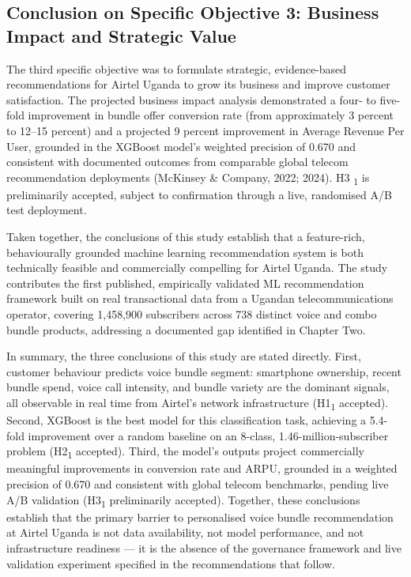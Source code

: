 \subsection{Conclusion on Specific Objective 3: Business Impact and Strategic Value}

The third specific objective was to formulate strategic, evidence-based recommendations for Airtel Uganda to grow its business and improve customer satisfaction. The projected business impact analysis demonstrated a four- to five-fold improvement in bundle offer conversion rate (from approximately 3 percent to 12--15 percent) and a projected 9 percent improvement in Average Revenue Per User, grounded in the XGBoost model's weighted precision of 0.670 and consistent with documented outcomes from comparable global telecom recommendation deployments (McKinsey \& Company, 2022; 2024). H3	\textsubscript{1} is preliminarily accepted, subject to confirmation through a live, randomised A/B test deployment.

Taken together, the conclusions of this study establish that a feature-rich, behaviourally grounded machine learning recommendation system is both technically feasible and commercially compelling for Airtel Uganda. The study contributes the first published, empirically validated ML recommendation framework built on real transactional data from a Ugandan telecommunications operator, covering 1,458,900 subscribers across 738 distinct voice and combo bundle products, addressing a documented gap identified in Chapter Two.

In summary, the three conclusions of this study are stated directly. First,
customer behaviour predicts voice bundle segment: smartphone ownership, recent
bundle spend, voice call intensity, and bundle variety are the dominant signals,
all observable in real time from Airtel's network infrastructure
(H1\textsubscript{1} accepted). Second, XGBoost is the best model for this
classification task, achieving a 5.4-fold improvement over a random baseline on
an 8-class, 1.46-million-subscriber problem (H2\textsubscript{1} accepted). Third,
the model's outputs project commercially meaningful improvements in conversion rate
and ARPU, grounded in a weighted precision of 0.670 and consistent with global
telecom benchmarks, pending live A/B validation
(H3\textsubscript{1} preliminarily accepted). Together, these conclusions establish
that the primary barrier to personalised voice bundle recommendation at Airtel
Uganda is not data availability, not model performance, and not infrastructure
readiness --- it is the absence of the governance framework and live validation
experiment specified in the recommendations that follow.

